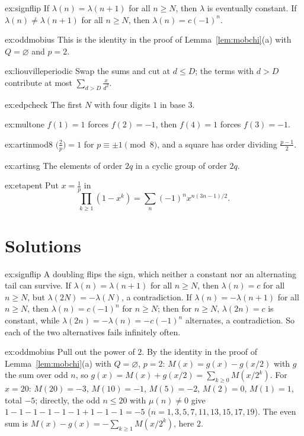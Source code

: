 \begin{hint}{ex:signflip}
If $\lambda(n)=\lambda(n+1)$ for all $n\ge N$, then $\lambda$ is eventually constant. If $\lambda(n)\ne\lambda(n+1)$ for all $n\ge N$, then $\lambda(n)=c(-1)^n$.
\end{hint}
\begin{hint}{ex:oddmobius}
This is the identity in the proof of Lemma~\ref{lem:mobchi}(a) with $Q=\varnothing$ and $p=2$.
\end{hint}
\begin{hint}{ex:liouvilleperiodic}
Swap the sums and cut at $d\le D$; the terms with $d>D$ contribute at most $\sum_{d>D}\frac x{d^2}$.
\end{hint}
\begin{hint}{ex:edpcheck}
The first $N$ with four digits $1$ in base $3$.
\end{hint}
\begin{hint}{ex:multone}
$f(1)=1$ forces $f(2)=-1$, then $f(4)=1$ forces $f(3)=-1$.
\end{hint}
\begin{hint}{ex:artinmod8}
$\bigl(\frac2p\bigr)=1$ for $p\equiv\pm1\pmod8$, and a square has order dividing $\frac{p-1}2$.
\end{hint}
\begin{hint}{ex:artinsg}
The elements of order $2q$ in a cyclic group of order $2q$.
\end{hint}
\begin{hint}{ex:etapent}
Put $x=\frac1p$ in
\[
\prod_{k\ge1}(1-x^k)=\sum_n(-1)^nx^{n(3n-1)/2}.
\]
\end{hint}

\section{Solutions}

\begin{solution}{ex:signflip}
\idea A doubling flips the sign, which neither a constant nor an alternating tail can survive.
\writeup If $\lambda(n)=\lambda(n+1)$ for all $n\ge N$, then $\lambda(n)=c$ for all $n\ge N$, but $\lambda(2N)=-\lambda(N)$, a contradiction. If
$\lambda(n)=-\lambda(n+1)$ for all $n\ge N$, then $\lambda(n)=c(-1)^n$ for $n\ge N$; then for $n\ge N$, $\lambda(2n)=c$ is constant, while $\lambda(2n)=-\lambda(n)=-c(-1)^n$
alternates, a contradiction. So each of the two alternatives fails infinitely often.
\end{solution}


\begin{solution}{ex:oddmobius}
\idea Pull out the power of $2$.
\writeup By the identity in the proof of Lemma~\ref{lem:mobchi}(a) with $Q=\varnothing$, $p=2$: $M(x)=g(x)-g(x/2)$ with $g$ the sum over odd $n$, so
$g(x)=M(x)+g(x/2)=\sum_{k\ge0}M(x/2^k)$. For $x=20$: $M(20)=-3$, $M(10)=-1$, $M(5)=-2$, $M(2)=0$, $M(1)=1$, total $-5$; directly, the odd $n\le20$ with
$\mu(n)\ne0$ give $1-1-1-1-1-1+1-1-1=-5$ ($n=1,3,5,7,11,13,15,17,19$). The even sum is $M(x)-g(x)=-\sum_{k\ge1}M(x/2^k)$, here $2$.
\end{solution}

